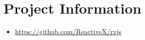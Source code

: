 \section{Project Information}




\begin{itemize}
  \item \url{https://github.com/ReactiveX/rxjs}
\end{itemize}

